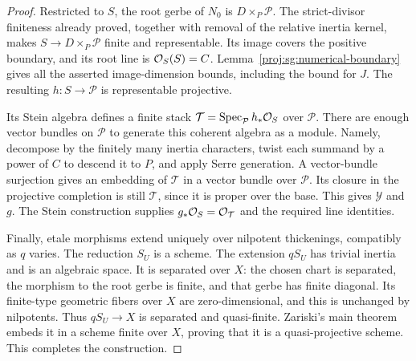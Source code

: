 \begin{proof}
Restricted to $S$, the root gerbe of $N_0$ is
$D\times_P\mathcal P$.  The strict-divisor finiteness already
proved, together with removal of the relative inertia kernel,
makes $S\to D\times_P\mathcal P$ finite and representable.
Its image covers the positive boundary, and its root line is
$\mathcal{O}_S(S)=C$.  Lemma~\ref{proj:sg:numerical-boundary} gives all the
asserted image-dimension bounds, including the bound for $J$.
The resulting $h:S\to\mathcal P$ is representable projective.

Its Stein algebra defines a finite stack
$\mathcal T=\operatorname{Spec}_{\mathcal P}h_*\mathcal{O}_S$ over $\mathcal P$.
There are enough vector bundles on $\mathcal P$ to generate
this coherent algebra as a module.  Namely, decompose by the
finitely many inertia characters, twist each summand by a
power of $C$ to descend it to $P$, and apply Serre generation.
A vector-bundle surjection gives an embedding of $\mathcal T$
in a vector bundle over $\mathcal P$.  Its closure in the
projective completion is still $\mathcal T$, since it is
proper over the base.  This gives $\mathcal Y$ and $g$.
The Stein construction supplies $g_*\mathcal{O}_S=\mathcal{O}_{\mathcal T}$
and the required line identities.

Finally, etale morphisms extend uniquely over nilpotent
thickenings, compatibly as $q$ varies.  The reduction $S_U$
is a scheme.  The extension $qS_U$ has trivial inertia and
is an algebraic space.  It is separated over $X$: the chosen
chart is separated, the morphism to the root gerbe is finite,
and that gerbe has finite diagonal.  Its finite-type
geometric fibers over $X$ are zero-dimensional, and this is
unchanged by nilpotents.  Thus $qS_U\to X$ is separated and
quasi-finite.  Zariski's main theorem embeds it in a scheme
finite over $X$, proving that it is a quasi-projective
scheme.  This completes the construction.
\end{proof}
